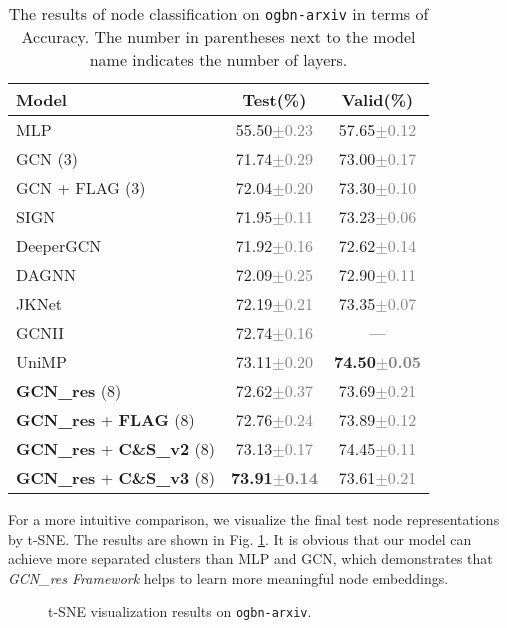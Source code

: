 \documentclass[runningheads]{llncs}
\newcommand{\std}[1]{\textcolor{gray}{\scriptsize{$\pm$#1}}}
\begin{document}
\begin{table}[htbp] 
\caption{The results of node classification on \texttt{ogbn-arxiv} in terms of Accuracy. The number in parentheses next to
the model name indicates the number of layers.}
\label{table:ogbn-arxiv-baseline}
\begin{center}
\renewcommand\tabcolsep{7.0pt}
\begin{tabular}{l|c|c}
\hline
\textbf{Model}  & \textbf{Test(\%)} & \textbf{Valid(\%)}  \\
\hline
\hline
MLP  & 55.50\std{0.23} & 57.65\std{0.12} \\
GCN (3) \cite{kipf2016semi} & 71.74\std{0.29} & 73.00\std{0.17} \\
GCN + FLAG (3) & 72.04\std{0.20} & 73.30\std{0.10} \\
SIGN \cite{rossi2020sign} & 71.95\std{0.11} & 73.23\std{0.06} \\
DeeperGCN \cite{li2020deepergcn} & 71.92\std{0.16} & 72.62\std{0.14} \\
DAGNN \cite{liu2020towards} & 72.09\std{0.25} & 72.90\std{0.11} \\
JKNet \cite{xu2018representation} & 72.19\std{0.21} & 73.35\std{0.07} \\
GCNII \cite{chen2020simple}& 72.74\std{0.16} & --- \\
UniMP \cite{shi2020masked}& 73.11\std{0.20} & \textbf{74.50\std{0.05}} \\
\hline
\hline
\textbf{GCN\_res} (8) & 72.62\std{0.37} & 73.69\std{0.21} \\
\textbf{GCN\_res} + \textbf{FLAG} (8) & 72.76\std{0.24} & 73.89\std{0.12} \\
\textbf{GCN\_res} + \textbf{C\&S\_v2} (8) & 73.13\std{0.17} & 74.45\std{0.11} \\
\textbf{GCN\_res} + \textbf{C\&S\_v3} (8) & \textbf{73.91\std{0.14}} &
73.61\std{0.21} \\
\hline
\end{tabular}
\end{center} 
\end{table}


For a more intuitive comparison, we visualize the final test node representations by t-SNE. The results are shown in Fig. \ref{fig:tSNE}. It is obvious that our model can achieve more separated clusters than MLP and GCN, which demonstrates that \textsl{GCN\_res Framework} helps to learn more meaningful node embeddings.


\begin{figure}[htbp]
\centering
{}
\quad
{}
\quad
{}
\quad
{}
\caption{t-SNE visualization results on \texttt{ogbn-arxiv}.}
\label{fig:tSNE}
\end{figure}
\end{document}
